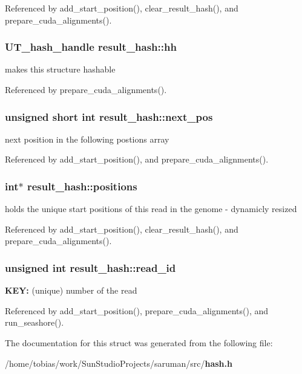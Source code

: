 Referenced by add\_\-start\_\-position(), clear\_\-result\_\-hash(), and prepare\_\-cuda\_\-alignments().
\subsubsection[{hh}]{\setlength{\rightskip}{0pt plus 5cm}UT\_\-hash\_\-handle {\bf result\_\-hash::hh}}\label{structresult__hash_b6e5ade0cc7cd2abec450b24a3d8de76}


makes this structure hashable 

Referenced by prepare\_\-cuda\_\-alignments().
\subsubsection[{next\_\-pos}]{\setlength{\rightskip}{0pt plus 5cm}unsigned short int {\bf result\_\-hash::next\_\-pos}}\label{structresult__hash_0e36c05be17e1b406af4f2699285757c}


next position in the following postions array 

Referenced by add\_\-start\_\-position(), and prepare\_\-cuda\_\-alignments().
\subsubsection[{positions}]{\setlength{\rightskip}{0pt plus 5cm}int$\ast$ {\bf result\_\-hash::positions}}\label{structresult__hash_c3dadbd5d4030ddf8dc5d955c10e53c1}


holds the unique start positions of this read in the genome - dynamicly resized 

Referenced by add\_\-start\_\-position(), clear\_\-result\_\-hash(), and prepare\_\-cuda\_\-alignments().
\subsubsection[{read\_\-id}]{\setlength{\rightskip}{0pt plus 5cm}unsigned int {\bf result\_\-hash::read\_\-id}}\label{structresult__hash_9215cd565c40433c535c92f43eb775bd}


{\bf KEY:} (unique) number of the read 

Referenced by add\_\-start\_\-position(), prepare\_\-cuda\_\-alignments(), and run\_\-seashore().

The documentation for this struct was generated from the following file:\begin{CompactItemize}
\item 
/home/tobias/work/SunStudioProjects/saruman/src/{\bf hash.h}\end{CompactItemize}
